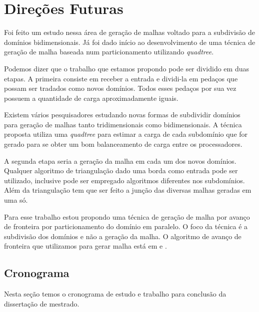\pagestyle{empty}
\cleardoublepage
\pagestyle{fancy}
\chapter{Direções Futuras}\label{cap4}

Foi feito um estudo nessa área de geração de malhas voltado para a subdivisão de domínios bidimensionais. Já foi dado início ao desenvolvimento de uma técnica de geração de malha baseada num particionamento utilizando \textit{quadtree}.

Podemos dizer que o trabalho que estamos propondo pode ser dividido em duas etapas. A primeira consiste em receber a entrada e dividi-la em pedaços que possam ser tradados como novos domínios. Todos esses pedaços por sua vez possuem a quantidade de carga aproximadamente iguais.

Existem vários pesquisadores estudando novas formas de subdividir domínios para geração de malhas tanto tridimensionais como bidimensionais. A técnica proposta utiliza uma \textit{quadtree} para estimar a carga de cada subdomínio que for gerado para se obter um bom balanceamento de carga entre os processadores.

A segunda etapa seria a geração da malha em cada um dos novos domínios. Qualquer algoritmo de triangulação dado uma borda como entrada pode ser utilizado, inclusive pode ser empregado algoritmos diferentes nos subdomínios. Além da triangulação tem que ser feito a junção das diversas malhas geradas em uma só.

Para esse trabalho estou propondo uma técnica de geração de malha por avanço de fronteira por particionamento do domínio em paralelo. O foco da técnica é a subdivisão dos domínios e não a geração da malha. O algoritmo de avanço de fronteira que utilizamos para gerar malha está em \cite{bib:Miranda99} e \cite{bib:Cavalcante-Neto01}.

\section{Cronograma}
Nesta seção temos o cronograma de estudo e trabalho para conclusão da dissertação de mestrado.

